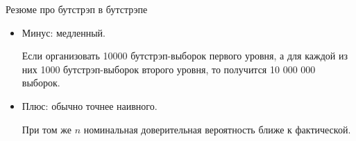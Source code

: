 \begin{frame}{Резюме про бутстрэп в бутстрэпе}
  \begin{itemize}[<+->]
    \item \alert{Минус:} медленный. 
    
    Если организовать 10000 бутстрэп-выборок первого уровня, а для каждой из них 1000 бутстрэп-выборок второго уровня,
    то получится 10 000 000 выборок.

    \item \alert{Плюс:} обычно точнее наивного. 
    
    При том же $n$ номинальная доверительная вероятность ближе к фактической. 
  \end{itemize}

\end{frame}